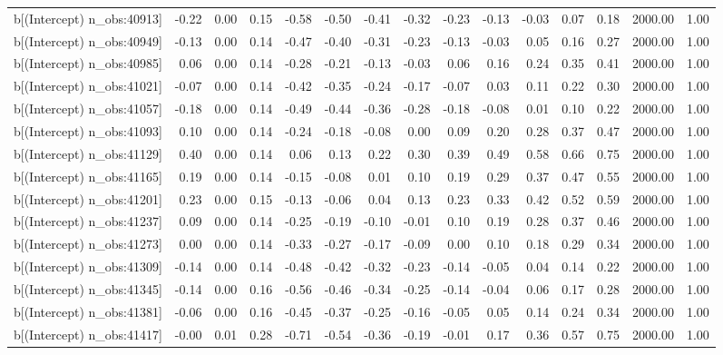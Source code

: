 \begin{table}[ht]
\begin{tabular}{rrrrrrrrrrrrrrr}
  b[(Intercept) n\_obs:40913] & -0.22 & 0.00 & 0.15 & -0.58 & -0.50 & -0.41 & -0.32 & -0.23 & -0.13 & -0.03 & 0.07 & 0.18 & 2000.00 & 1.00 \\ 
  b[(Intercept) n\_obs:40949] & -0.13 & 0.00 & 0.14 & -0.47 & -0.40 & -0.31 & -0.23 & -0.13 & -0.03 & 0.05 & 0.16 & 0.27 & 2000.00 & 1.00 \\ 
  b[(Intercept) n\_obs:40985] & 0.06 & 0.00 & 0.14 & -0.28 & -0.21 & -0.13 & -0.03 & 0.06 & 0.16 & 0.24 & 0.35 & 0.41 & 2000.00 & 1.00 \\ 
  b[(Intercept) n\_obs:41021] & -0.07 & 0.00 & 0.14 & -0.42 & -0.35 & -0.24 & -0.17 & -0.07 & 0.03 & 0.11 & 0.22 & 0.30 & 2000.00 & 1.00 \\ 
  b[(Intercept) n\_obs:41057] & -0.18 & 0.00 & 0.14 & -0.49 & -0.44 & -0.36 & -0.28 & -0.18 & -0.08 & 0.01 & 0.10 & 0.22 & 2000.00 & 1.00 \\ 
  b[(Intercept) n\_obs:41093] & 0.10 & 0.00 & 0.14 & -0.24 & -0.18 & -0.08 & 0.00 & 0.09 & 0.20 & 0.28 & 0.37 & 0.47 & 2000.00 & 1.00 \\ 
  b[(Intercept) n\_obs:41129] & 0.40 & 0.00 & 0.14 & 0.06 & 0.13 & 0.22 & 0.30 & 0.39 & 0.49 & 0.58 & 0.66 & 0.75 & 2000.00 & 1.00 \\ 
  b[(Intercept) n\_obs:41165] & 0.19 & 0.00 & 0.14 & -0.15 & -0.08 & 0.01 & 0.10 & 0.19 & 0.29 & 0.37 & 0.47 & 0.55 & 2000.00 & 1.00 \\ 
  b[(Intercept) n\_obs:41201] & 0.23 & 0.00 & 0.15 & -0.13 & -0.06 & 0.04 & 0.13 & 0.23 & 0.33 & 0.42 & 0.52 & 0.59 & 2000.00 & 1.00 \\ 
  b[(Intercept) n\_obs:41237] & 0.09 & 0.00 & 0.14 & -0.25 & -0.19 & -0.10 & -0.01 & 0.10 & 0.19 & 0.28 & 0.37 & 0.46 & 2000.00 & 1.00 \\ 
  b[(Intercept) n\_obs:41273] & 0.00 & 0.00 & 0.14 & -0.33 & -0.27 & -0.17 & -0.09 & 0.00 & 0.10 & 0.18 & 0.29 & 0.34 & 2000.00 & 1.00 \\ 
  b[(Intercept) n\_obs:41309] & -0.14 & 0.00 & 0.14 & -0.48 & -0.42 & -0.32 & -0.23 & -0.14 & -0.05 & 0.04 & 0.14 & 0.22 & 2000.00 & 1.00 \\ 
  b[(Intercept) n\_obs:41345] & -0.14 & 0.00 & 0.16 & -0.56 & -0.46 & -0.34 & -0.25 & -0.14 & -0.04 & 0.06 & 0.17 & 0.28 & 2000.00 & 1.00 \\ 
  b[(Intercept) n\_obs:41381] & -0.06 & 0.00 & 0.16 & -0.45 & -0.37 & -0.25 & -0.16 & -0.05 & 0.05 & 0.14 & 0.24 & 0.34 & 2000.00 & 1.00 \\ 
  b[(Intercept) n\_obs:41417] & -0.00 & 0.01 & 0.28 & -0.71 & -0.54 & -0.36 & -0.19 & -0.01 & 0.17 & 0.36 & 0.57 & 0.75 & 2000.00 & 1.00 \\ 

\end{tabular}
\end{table}
